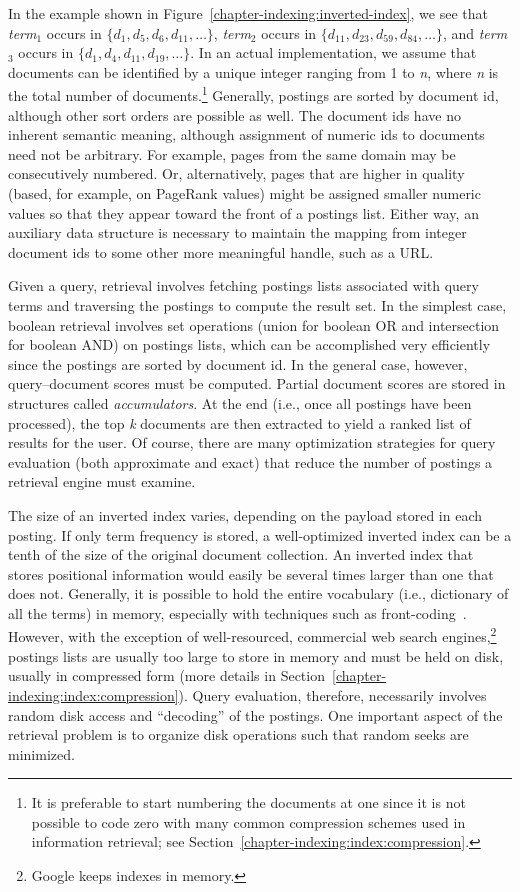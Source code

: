 In the example shown in Figure~\ref{chapter-indexing:inverted-index},
we see that \emph{term}$_1$ occurs in $\{d_1, d_5, d_6, d_{11},
\ldots\}$, \emph{term}$_2$ occurs in $\{d_{11}, d_{23}, d_{59}, d_{84},
\ldots\}$, and \emph{term}$_3$ occurs in $\{d_1, d_4, d_{11}, d_{19},
\ldots\}$.  In an actual implementation, we assume that documents can
be identified by a unique integer ranging from 1 to \emph{n}, where
\emph{n} is the total number of documents.\footnote{It is preferable to
  start numbering the documents at one since it is not possible to
  code zero with many common compression schemes used in information
  retrieval; see Section~\ref{chapter-indexing:index:compression}.}
Generally, postings are sorted by document id, although other sort
orders are possible as well.  The document ids have no inherent
semantic meaning, although assignment of numeric ids to documents need
not be arbitrary.  For example, pages from the same domain may be
consecutively numbered.  Or, alternatively, pages that are higher in
quality (based, for example, on PageRank values) might be assigned
smaller numeric values so that they appear toward the front of a
postings list.  Either way, an auxiliary data structure is necessary
to maintain the mapping from integer document ids to some other more
meaningful handle, such as a URL.

Given a query, retrieval involves fetching postings lists associated
with query terms and traversing the postings to compute the result
set.  In the simplest case, boolean retrieval involves set operations
(union for boolean OR and intersection for boolean AND) on postings
lists, which can be accomplished very efficiently since the postings
are sorted by document id.  In the general case, however,
query--document scores must be computed.  Partial document scores are
stored in structures called \emph{accumulators}.  At the end (i.e.,
once all postings have been processed), the top \emph{k} documents are
then extracted to yield a ranked list of results for the user.  Of
course, there are many optimization strategies for query evaluation
(both approximate and exact) that reduce the number of postings a
retrieval engine must examine.

The size of an inverted index varies, depending on the payload stored
in each posting.  If only term frequency is stored, a well-optimized
inverted index can be a tenth of the size of the original document
collection.  An inverted index that stores positional information
would easily be several times larger than one that does not.
Generally, it is possible to hold the entire vocabulary (i.e.,
dictionary of all the terms) in memory, especially with techniques
such as front-coding~\cite{Witten_etal_1999}.  However, with the
exception of well-resourced, commercial web search
engines,\footnote{Google keeps indexes in memory.}  postings lists are
usually too large to store in memory and must be held on disk, usually
in compressed form (more details in
Section~\ref{chapter-indexing:index:compression}).  Query evaluation,
therefore, necessarily involves random disk access and ``decoding'' of
the postings.  One important aspect of the retrieval problem is to
organize disk operations such that random seeks are minimized.

